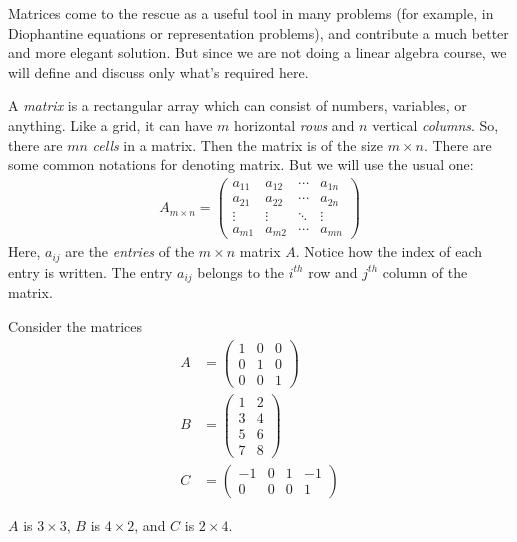 \documentclass{subfile}
\begin{document}
	Matrices come to the rescue as a useful tool in many problems (for example, in Diophantine equations or representation problems), and contribute a much better and more elegant solution. But since we are not doing a linear algebra course, we will define and discuss only what's required here.

	\begin{definition}[Matrix]
		A \textit{matrix} is a rectangular array which can consist of numbers, variables, or anything. Like a grid, it can have $m$ horizontal \textit{rows} and $n$ vertical \textit{columns}. So, there are $mn$ \textit{cells} in a matrix. Then the matrix is of the size $m\times n$. There are some common notations for denoting matrix. But we will use the usual one:
		\begin{align*}
		{A_{m \times n}} = \begin{pmatrix}
			{{a_{11}}}&{{a_{12}}}& \cdots &{{a_{1n}}}\\
			{{a_{21}}}&{{a_{22}}}& \cdots &{{a_{2n}}}\\
			\vdots & \vdots & \ddots & \vdots \\
			{{a_{m1}}}&{{a_{m2}}}& \cdots &{{a_{mn}}}
			\end{pmatrix}
			\end{align*}
		Here, $a_{ij}$ are the \textit{entries} of the $m\times n$ matrix $A$. Notice how the index of each entry is written. The entry $a_{ij}$ belongs to the $i^{th}$ row and $j^{th}$ column of the matrix.
	\end{definition}

	\begin{example}
	Consider the matrices
		\begin{align*}
		A
			&
			= \begin{pmatrix}
			1&0&0\\
			0&1&0\\
			0&0&1
			\end{pmatrix}\\
		B
			&
			= \begin{pmatrix}
			1&2\\
			3&4\\
			5&6\\
			7&8
			\end{pmatrix}\\
		C
			&
			= \begin{pmatrix}
			{ - 1}&0&1&{ - 1}\\
			0&0&0&1
			\end{pmatrix}
		\end{align*}

	$A$ is $3\times 3$, $B$ is $4\times 2$, and $C$ is $2 \times 4$.
	\end{example}
\end{document}
